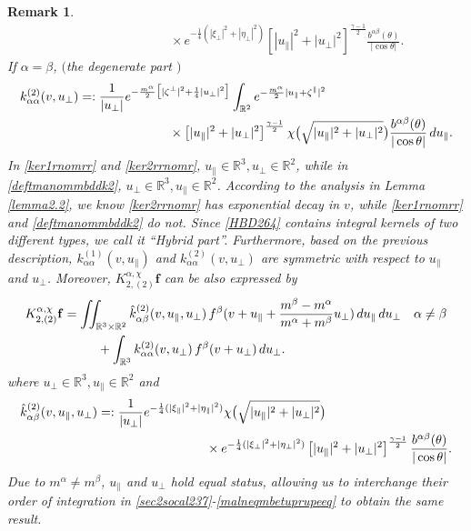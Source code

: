 \documentclass[reqno]{amsart}
\numberwithin{equation}{section}
\newtheorem{remark}[theorem]{Remark}
\numberwithin{equation}{section}
\begin{document}
\begin{remark}
\begin{align}
			&\hspace{3cm}\times  e^{-\frac{1}{4}(|\xi_{\perp}|^2+|\eta_{\perp}|^2) } \left[|u_{\parallel}|^2 + |u_{\perp}|^2\right]^{\frac{\gamma - 1}{2}}\frac{b^{ \alpha \beta}(\theta)}{|\cos \theta|}.\label{ker2rrnomr}
		\end{align}
		If $\alpha = \beta$, $($the degenerate part $)$
		\begin{align}
			k_{\alpha \alpha}^{(2)}(v,u_{\perp})	&=: \frac{1}{|u_{\perp}|} e^{-\frac{m^\alpha}{2}\big[|\zeta^{\perp}|^2+\frac{1}{4}|u_{\perp}|^2\big]} \int_{\mathbb{R}^2} e^{-\frac{m^\alpha}{2}|u_{\parallel} + \zeta^{\parallel}|^2}\notag \\
			&\hspace{2.5cm}\times  \left[|u_{\parallel}|^2 + |u_{\perp}|^2\right]^{\frac{\gamma - 1}{2}} \chi\big(\sqrt{|u_{\parallel}|^2 + |u_{\perp}|^2}\big) \frac{b^{ \alpha \beta}(\theta)}{|\cos \theta|} \, du_{\parallel}. \label{deftmanommbddk2}
		\end{align}
		In \eqref{ker1rnomrr} and \eqref{ker2rrnomr}, $u_{\parallel} \in \mathbb{R}^3, u_{\perp} \in \mathbb{R}^2$, while in \eqref{deftmanommbddk2}, $u_{\perp} \in \mathbb{R}^3, u_{\parallel} \in \mathbb{R}^2$. According to the analysis in Lemma \ref{lemma2.2}, we know \eqref{ker2rrnomr} has exponential decay in $v$, while \eqref{ker1rnomrr} and \eqref{deftmanommbddk2} do not.  Since \eqref{HBD264} contains integral kernels of two different types, we call it ``Hybrid part''. Furthermore, based on the previous  description,  $k_{\alpha \alpha}^{(1)}(v,u_{\parallel})$ and $k_{\alpha \alpha}^{(2)}(v,u_{\perp})$ are symmetric with respect to $u_{\parallel}$ and $u_{\perp}$. Moreover, $K_{2,(2)}^{\alpha,\chi}\mathbf{f}$ can be also expressed by
		\begin{align*}
			&K_{2,(2)}^{\alpha,\chi}\mathbf{f}= \iint_{\mathbb{R}^3\times\mathbb{R}^2}\hat{k}_{\alpha \beta}^{(2)}(v,u_{\parallel},u_{\perp}) \,f^\beta(v + u_{\parallel}+\frac{m^{\beta}-m^{\alpha}}{m^{\alpha}+m^{\beta}}u_{\perp})\,d u_{\parallel}\,du_{\perp} \quad \alpha \neq \beta \notag\\
			&\hspace{2cm}+\int_{\mathbb{R}^3}k_{\alpha \alpha}^{(2)}(v,u_{\perp}) \,f^\beta(v + u_{\perp})\,du_{\perp}. 
		\end{align*}
		where $u_{\perp} \in \mathbb{R}^3, u_{\parallel} \in \mathbb{R}^2$ and
		\begin{align*}
			\hat{k}_{\alpha \beta}^{(2)}(v,u_{\parallel},u_{\perp})	&=:  \frac{1}{|u_{\perp}|} e^{-\frac{1}{4}(|\xi_{\parallel}|^2+|\eta_{\parallel}|^2)} \chi\big(\sqrt{|u_{\parallel}|^2 + |u_{\perp}|^2}\big) \notag\\
			&\hspace{3cm}\times  e^{-\frac{1}{4}(|\xi_{\perp}|^2+|\eta_{\perp}|^2) } \left[|u_{\parallel}|^2 + |u_{\perp}|^2\right]^{\frac{\gamma - 1}{2}}\frac{b^{ \alpha \beta}(\theta)}{|\cos \theta|}.
		\end{align*}
		Due to $m^{\alpha} \neq m^{\beta}$, $u_{\parallel}$ and $u_{\perp}$ hold equal status, allowing us to interchange their order of integration in \eqref{sec2socal237}-\eqref{malneqmbetuprupeeq} to obtain the same result.
	\end{remark}
	
\end{document}
